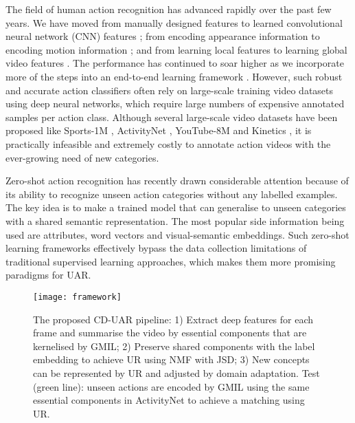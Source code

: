\documentclass[10pt,twocolumn,letterpaper]{article}
\begin{document}
The field of human action recognition has advanced rapidly over the past few years. We have moved from manually designed features \cite{idtfWang2013,videoDarwin} to learned convolutional neural network (CNN) features \cite{c3d2015,KarpathyCVPR14}; from encoding appearance information to encoding motion information \cite{twostream2014,longTemporalConv2016,atf_cvpr17}; and from learning local features to learning global video features \cite{TSN2016ECCV, diba_tle_2016,dovf_lan_2017}. The performance has continued to soar higher as we incorporate more of the steps into an end-to-end learning framework \cite{depth2action,hidden_zhu_17}. However, such robust and accurate action classifiers often rely on large-scale training video datasets using deep neural networks, which require large numbers of expensive annotated samples per action class. Although several large-scale video datasets have been proposed like Sports-1M \cite{KarpathyCVPR14}, ActivityNet \cite{activityNet}, YouTube-8M \cite{YouTube_8M_2016} and Kinetics \cite{kinetics}, it is practically infeasible and extremely costly to annotate action videos with the ever-growing need of new categories. 

Zero-shot action recognition has recently drawn considerable attention because of its ability to recognize unseen action categories without any labelled examples. The key idea is to make a trained model that can generalise to unseen categories with a shared semantic representation. The most popular side information being used are attributes, word vectors and visual-semantic embeddings. Such zero-shot learning frameworks effectively bypass the data collection limitations of traditional supervised learning approaches, which makes them more promising paradigms for UAR.


\begin{figure*}
	\centering
	\texttt{[image: framework]}
	\vspace{-1ex}
	\caption{The proposed CD-UAR pipeline: 1) Extract deep features for each frame and summarise the video by essential components that are kernelised by GMIL; 2) Preserve shared components with the label embedding to achieve UR using NMF with JSD; 3) New concepts can be represented by UR and adjusted by domain adaptation. Test (green line): unseen actions are encoded by GMIL using the same essential components in ActivityNet to achieve a matching using UR. \label{framework}}
	\vspace{-2ex}
\end{figure*}
\end{document}
